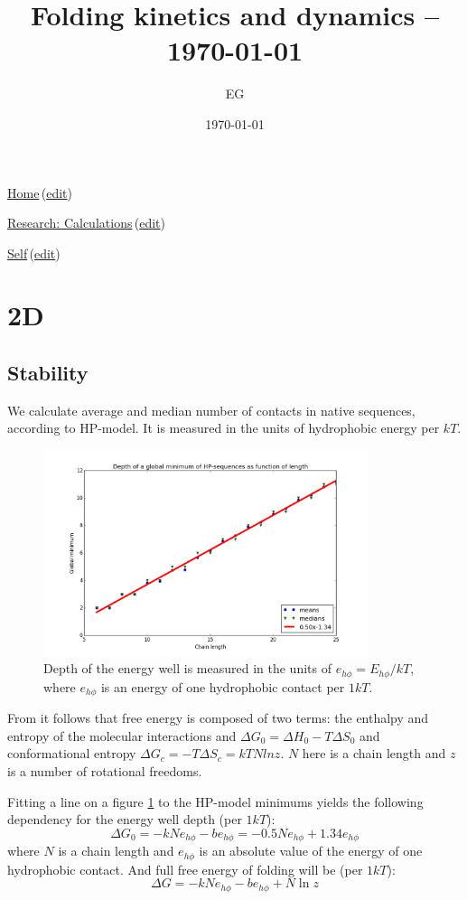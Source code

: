 \documentclass[12pt]{paper}
\title{Folding kinetics and dynamics -- \today}
\author{EG}
\date{\today}
\newcommand{\gD}{\Delta}
\newcommand{\wikilink}[2] { \href{#1.pdf}{#2}\,(\href{#1.tex}{edit})}
\begin{document}
 \maketitle
\wikilink{home}{Home}

\wikilink{research\_calculations}{Research: Calculations}

\wikilink{folding\_kinetics\_and\_dynamics}{Self}

\section{2D}
\subsection{Stability}\label{sec:stability}
We  calculate average and median number of contacts in native sequences, according to 
HP-model. It is measured in the units of hydrophobic energy per $kT$.
\begin{figure}[h!]
  \centering
  \includegraphics[width=0.85\textwidth]{pictures/hp-depth-length.png} 
  \caption{Depth of the energy well is measured in the units of $e_{h\phi}=E_{h\phi}/kT$, where 
$e_{h\phi}$ is an 
energy of one hydrophobic contact per $1kT$.}
  \label{fig:hp-depth-length}
\end{figure}
From \cite{Ghosh2009} it follows that free energy is composed of two terms: the enthalpy and 
entropy of the molecular interactions and $\gD G_0=\gD H_0-T\gD S_0$ and conformational entropy 
$\gD G_c=-T\gD S_c=kTN ln z$. $N$ here is a chain length and $z$ is a number of rotational 
freedoms.

Fitting a line on a figure \ref{fig:hp-depth-length} to the HP-model minimums yields the following 
dependency for the energy well depth (per $1kT$):
\begin{equation}
\gD G_0= -kNe_{h\phi}-be_{h\phi}= -0.5Ne_{h\phi} +1.34e_{h\phi}
\end{equation} 
where $N$ is a chain length and $e_{h\phi}$ is an absolute value of the energy 
of one hydrophobic contact.
And full free energy of folding will be (per $1kT$):
\begin{equation}
 \gD G = -kNe_{h\phi} -be_{h\phi}+N\ln z
\end{equation} 
\end{document}
